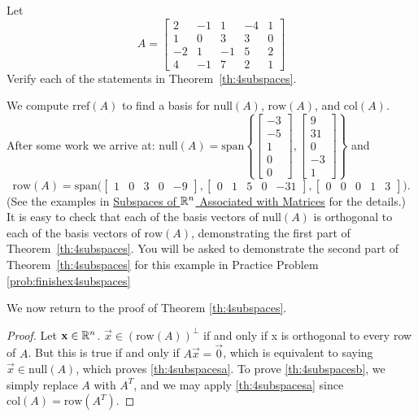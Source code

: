 \documentclass{ximera}
\begin{document}
\begin{example}\label{ex:4subspaces}
Let
$$A=\begin{bmatrix}2&-1&1&-4&1\\1&0&3&3&0\\-2&1&-1&5&2\\4&-1&7&2&1\end{bmatrix}$$
Verify each of the statements in Theorem~\ref{th:4subspaces}.

\begin{explanation}
 We compute $\mbox{rref}(A)$ to find a basis for   $\mbox{null}(A)$, $\mbox{row}(A)$, and $\mbox{col}(A)$.  After some work we arrive at:
 $\mbox{null}(A) = \mbox{span}\left\{\begin{bmatrix}-3\\-5\\1\\0\\0\end{bmatrix}, \begin{bmatrix}9\\31\\0\\-3\\1\end{bmatrix}\right\}$ 
 and
 $$\mbox{row}(A)=\mbox{span}\Big(\begin{bmatrix}1&0&3&0&-9\end{bmatrix},
\begin{bmatrix}0&1&5&0&-31\end{bmatrix},
\begin{bmatrix}0&0&0&1&3\end{bmatrix}\Big).$$  (See the examples in \href{https://ximera.osu.edu/oerlinalg/LinearAlgebra/VSP-0040/main}{Subspaces of $\mathbb{R}^n$ Associated with Matrices} for the details.) It is easy to check that each of the basis vectors of $\mbox{null}(A)$ is orthogonal to each of the basis vectors of $\mbox{row}(A)$, demonstrating the first part of Theorem~\ref{th:4subspaces}.  You will be asked to demonstrate the second part of Theorem~\ref{th:4subspaces} for this example in Practice Problem \ref{prob:finishex4subspaces}
\end{explanation}
\end{example}

We now return to the proof of Theorem \ref{th:4subspaces}.

\begin{proof}
Let $\mathbf{x}\in\mathbb{R}^n$.  $\vec{x}\in\left(\mbox{row}(A)\right)^\perp$ if and only if x is orthogonal to every row of $A$.  But this is true if and only if $A\vec{x}=\vec{0}$, which is equivalent to saying $\vec{x}\in\mbox{null}(A)$, which proves \ref{th:4subspacesa}.  To prove \ref{th:4subspacesb}, we simply replace $A$ with $A^T$, and we may apply \ref{th:4subspacesa} since $\mbox{col}(A) = \mbox{row}(A^T)$.
\end{proof}
\end{document}
